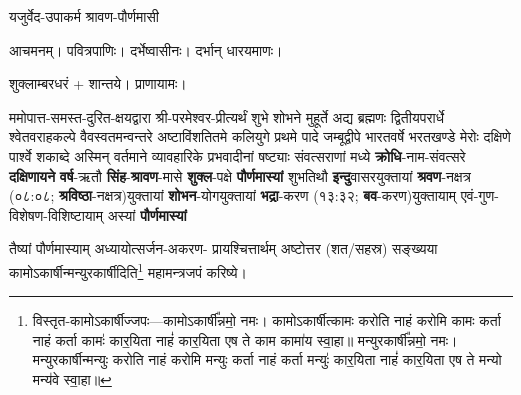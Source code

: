 
\newcommand{\sep}{\hspace{-0.5ex}{\small$\circ$}\hspace{0.5ex}}
\newcommand{\yutithyadi}{\textbf{क्रोधि}-नाम-संवत्सरे \textbf{दक्षिणायने} \textbf{वर्ष}-ऋतौ \textbf{सिंह}-\textbf{श्रावण}-मासे \textbf{शुक्ल}-पक्षे \textbf{पौर्णमास्यां} शुभतिथौ \textbf{इन्दु}\-वासर\-युक्तायां \textbf{श्रवण}-नक्षत्र (०८:०८; \textbf{श्रविष्ठा}-नक्षत्र)\-युक्तायां \textbf{शोभन}-योग\-युक्तायां \textbf{भद्रा}-करण (१३:३२; \textbf{बव}-करण)\-युक्तायाम् एवं-गुण-विशेषण-विशिष्टायाम् अस्यां \textbf{पौर्णमास्यां}}

\pujainfobox
  {यजुर्वेद-उपाकर्म}
  {}
  {श्रावण-पौर्णमासी}
  {\blank{}}
  {\blank{}}
  {}
  {}

\begingroup


आचमनम्। पवित्रपाणिः। दर्भेष्वासीनः। दर्भान् धारयमाणः।

शुक्लाम्बरधरं + शान्तये। प्राणायामः।

ममोपात्त-समस्त-दुरित-क्षयद्वारा श्री-परमेश्वर-प्रीत्यर्थं शुभे शोभने मुहूर्ते अद्य ब्रह्मणः
द्वितीयपरार्धे श्वेतवराहकल्पे वैवस्वतमन्वन्तरे अष्टाविंशतितमे कलियुगे प्रथमे पादे
जम्बूद्वीपे भारतवर्षे भरतखण्डे मेरोः दक्षिणे पार्श्वे शकाब्दे अस्मिन् वर्तमाने व्यावहारिके
 प्रभवादीनां षष्ट्याः संवत्सराणां मध्ये
\yutithyadi

तैष्यां पौर्णमास्याम् अध्यायोत्सर्जन-अकरण- प्रायश्चित्तार्थम् अष्टोत्तर (शत/सहस्र) सङ्ख्यया कामोऽकार्षीन्मन्युरकार्षीदिति\footnote{विस्तृत-कामोऽकार्षीज्जपः—कामोऽकार्\mbox{}षी᳚न्नमो॒ नमः।
 कामोऽकार्\mbox{}षीत्कामः करोति नाहं करोमि कामः कर्ता नाहं कर्ता कामः॑ कार॒यिता नाहं॑ कार॒यिता एष ते काम कामा॑य स्वा॒हा॥ मन्युरकार्\mbox{}षी᳚न्नमो॒ नमः।
मन्युरकार्\mbox{}षीन्मन्युः करोति नाहं करोमि मन्युः कर्ता नाहं कर्ता मन्युः॑ कार॒यिता नाहं॑ कार॒यिता एष ते मन्यो मन्य॑वे स्वा॒हा॥} महा\-मन्त्र\-जपं करिष्ये।



